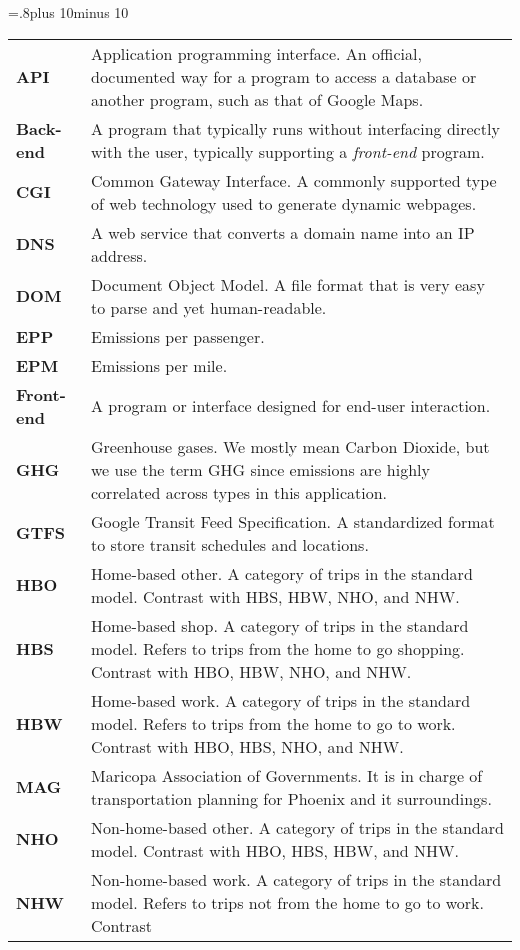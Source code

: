 
{\centering
\midcolumnwidth=.8\textwidth plus 10\tabcolsep minus 10\tabcolsep
\begin{tabular}{%
    >{\raggedright\bfseries}p{}%
    p{\midcolumnwidth}}
  API & Application programming interface. An official, documented way
  for a program to access a database or another program, such as that
  of Google Maps. \\
  Back-end & A program that typically runs without interfacing
  directly with the user, typically supporting a \emph{front-end}
  program. \\
  CGI & Common Gateway Interface. A commonly supported type of web
  technology used to generate dynamic webpages. \\
  DNS & A web service that converts a domain name into an IP
  address. \\
  DOM & Document Object Model. A file format that is very easy to
  parse and yet human-readable. \\
  EPP & Emissions per passenger. \\
  EPM & Emissions per mile. \\
  Front-end & A program or interface designed for end-user
  interaction. \\
  GHG & Greenhouse gases. We mostly mean Carbon Dioxide, but we use
  the term GHG since emissions are highly correlated across types in
  this application. \\
  GTFS & Google Transit Feed Specification. A standardized format to
  store transit schedules and locations. \\
  HBO & Home-based other. A category of trips in the
  standard  model. Contrast with HBS, HBW, NHO, and NHW. \\
  HBS & Home-based shop. A category of trips in the standard
  model. Refers to trips from the home to go shopping. Contrast with
  HBO, HBW, NHO, and NHW. \\
  HBW & Home-based work. A category of trips in the standard
  model. Refers to trips from the home to go to work. Contrast with
  HBO, HBS, NHO, and NHW. \\
  MAG & Maricopa Association of Governments. It is in charge of
  transportation planning for Phoenix and it surroundings. \\
  NHO & Non-home-based other. A category of trips in the standard
  model. Contrast with  HBO, HBS, HBW, and NHW. \\
  NHW & Non-home-based work. A category of trips in the standard
  model. Refers to trips not from the home to go to work. Contrast

\end{tabular}}
